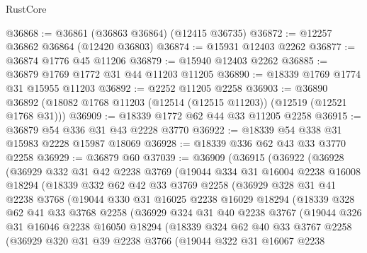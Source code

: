 \begin{lexlean}{RustCore}
\begin{coremodule}
@36868 := @36861 (@36863 @36864) (@12415 @36735)
@36872 := @12257 @36862 @36864 (@12420 @36803)
@36874 := @15931 @12403 @2262
@36877 := @36874 @1776 @45 @11206
@36879 := @15940 @12403 @2262
@36885 := @36879 @1769 @1772 @31 @44 @11203 @11205
@36890 := @18339 @1769 @1774 @31 @15955 @11203
@36892 := @2252 @11205 @2258
@36903 := @36890 @36892 (@18082 @1768 @11203 (@12514 (@12515 @11203)) (@12519 (@12521 @1768 @31)))
@36909 := @18339 @1772 @62 @44 @33 @11205 @2258
@36915 := @36879 @54 @336 @31 @43 @2228 @3770
@36922 := @18339 @54 @338 @31 @15983 @2228 @15987 @18069
@36928 := @18339 @336 @62 @43 @33 @3770 @2258
@36929 := @36879 @60
@37039 := @36909
    (@36915
      (@36922
        (@36928
          (@36929
            @332
            @31
            @42
            @2238
            @3769
            (@19044
              @334
              @31
              @16004
              @2238
              @16008
              @18294
              (@18339
                @332
                @62
                @42
                @33
                @3769
                @2258
                (@36929
                  @328
                  @31
                  @41
                  @2238
                  @3768
                  (@19044
                    @330
                    @31
                    @16025
                    @2238
                    @16029
                    @18294
                    (@18339
                      @328
                      @62
                      @41
                      @33
                      @3768
                      @2258
                      (@36929
                        @324
                        @31
                        @40
                        @2238
                        @3767
                        (@19044
                          @326
                          @31
                          @16046
                          @2238
                          @16050
                          @18294
                          (@18339
                            @324
                            @62
                            @40
                            @33
                            @3767
                            @2258
                            (@36929
                              @320
                              @31
                              @39
                              @2238
                              @3766
                              (@19044
                                @322
                                @31
                                @16067
                                @2238

\end{coremodule}
\end{lexlean}
